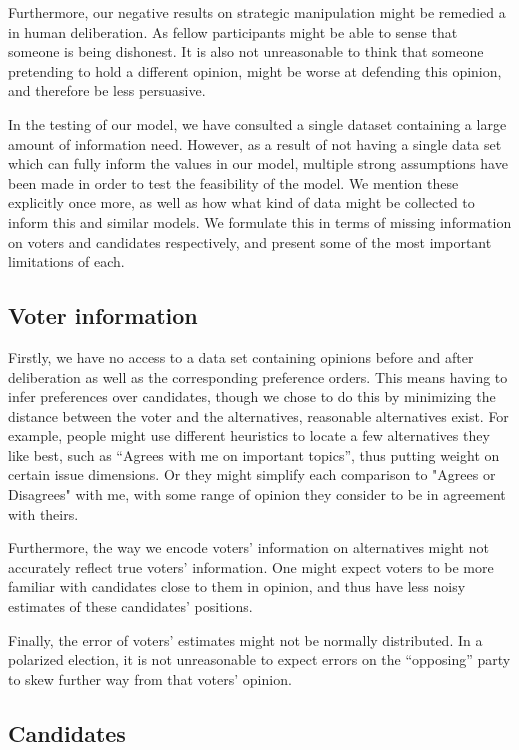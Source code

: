 Furthermore, our negative results on strategic manipulation might be remedied a
in human deliberation. As fellow participants might be able to sense that
someone is being dishonest. It is also not unreasonable to think that someone
pretending to hold a different opinion, might be worse at defending this
opinion, and therefore be less persuasive.

In the testing of our model, we have consulted a single dataset containing a
large amount of information need. 
However, as a result of not having a single
data set which can fully inform the values in our model, multiple strong
assumptions have been made in order to test the feasibility of the model. We
mention these explicitly once more, as well as how what kind of data might be
collected to inform this and similar models. We formulate this in terms of
missing information on voters and candidates respectively, and present some of
the most important limitations of each.


\subsection{Voter information}

Firstly, we have no access to a data set containing opinions before and after
deliberation as well as the corresponding preference orders. This means having to infer
preferences over candidates, though we chose to do this by minimizing the
distance between the voter and the alternatives, reasonable alternatives exist.
For example, people might use different heuristics to locate a few alternatives
they like best, such as ``Agrees with me on important topics'', thus putting weight on certain issue dimensions. Or they might
simplify each comparison to "Agrees or Disagrees" with me, with some range of
opinion they consider to be in agreement with theirs. 

Furthermore, the way we encode voters' information on alternatives might not
accurately reflect true voters' information. One might expect voters to be more
familiar with candidates close to them in opinion, and thus have less noisy
estimates of these candidates' positions. 

Finally,  the error of voters' estimates might not be normally distributed. In
a polarized election, it is not unreasonable to expect errors on the
``opposing'' party to skew further way from that voters' opinion.


\subsection{Candidates}

